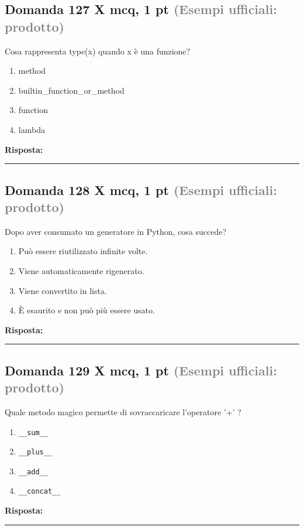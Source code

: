 \documentclass[a4paper,11pt]{article}
\begin{document}
\subsection*{Domanda 127 X \hfill {\small mcq, 1 pt \textcolor{gray}{(Esempi ufficiali: prodotto)}}}
Cosa rappresenta type(x) quando x è una funzione?

\begin{enumerate}[label=\alph*)]
\item method
\item builtin\_function\_or\_method
\item function
\item lambda
\end{enumerate}
\vspace{0.2cm}
\noindent\textbf{Risposta:}\par
\vspace{1.5cm}\hrule


\subsection*{Domanda 128 X \hfill {\small mcq, 1 pt \textcolor{gray}{(Esempi ufficiali: prodotto)}}}
Dopo aver consumato un generatore in Python, cosa succede?

\begin{enumerate}[label=\alph*)]
\item Può essere riutilizzato infinite volte.
\item Viene automaticamente rigenerato.
\item Viene convertito in lista.
\item È esaurito e non può più essere usato.
\end{enumerate}
\vspace{0.2cm}
\noindent\textbf{Risposta:}\par
\vspace{1.5cm}\hrule


\subsection*{Domanda 129 X \hfill {\small mcq, 1 pt \textcolor{gray}{(Esempi ufficiali: prodotto)}}}
Quale metodo magico permette di sovraccaricare l'operatore '+' ?

\begin{enumerate}[label=\alph*)]
\item \texttt{\_\_sum\_\_}
\item \texttt{\_\_plus\_\_}
\item \texttt{\_\_add\_\_}
\item \texttt{\_\_concat\_\_}
\end{enumerate}
\vspace{0.2cm}
\noindent\textbf{Risposta:}\par
\vspace{1.5cm}\hrule
\end{document}

